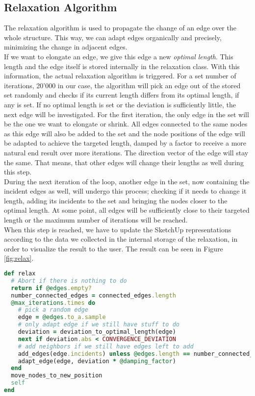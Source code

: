 \subsection{Relaxation Algorithm}\label{sec:relaxation}
The relaxation algorithm is used to propagate the change of an edge over the whole structure. This way, we can adapt edges organically and precisely, minimizing the change in adjacent edges.\\
If we want to elongate an edge, we give this edge a new \textit{optimal length}. This length and the edge itself is stored internally in the relaxation class. With this information, the actual relaxation algorithm is triggered. For a set number of iterations, 20'000 in our case, the algorithm will pick an edge out of the stored set randomly and checks if its current length differs from its optimal length, if any is set. If no optimal length is set or the deviation is sufficiently little, the next edge will be investigated. For the first iteration, the only edge in the set will be the one we want to elongate or shrink. All edges connected to the same nodes as this edge will also be added to the set and the node positions of the edge will be adapted to achieve the targeted length, damped by a factor to receive a more natural end result over more iterations. The direction vector of the edge will stay the same. That means, that other edges will change their lengths as well during this step.\\
During the next iteration of the loop, another edge in the set, now containing the incident edges as well, will undergo this process; checking if it needs to change it length, adding its incidents to the set and bringing the nodes closer to the optimal length. At some point, all edges will be sufficiently close to their targeted length or the maximum number of iterations will be reached.\\
When this step is reached, we have to update the SketchUp representations according to the data we collected in the internal storage of the relaxation, in order to visualize the result to the user. The result can be seen in Figure \ref{fig:relax}.

\begin{lstlisting}[language=Ruby, label={lst:relaxation}, caption=The relaxation algorithm]
def relax
  # Abort if there is nothing to do
  return if @edges.empty?
  number_connected_edges = connected_edges.length
  @max_iterations.times do
    # pick a random edge
    edge = @edges.to_a.sample
    # only adapt edge if we still have stuff to do
    deviation = deviation_to_optimal_length(edge)
    next if deviation.abs < CONVERGENCE_DEVIATION
    # add neighbors if we still have edges left to add
    add_edges(edge.incidents) unless @edges.length == number_connected_edges
    adapt_edge(edge, deviation * @damping_factor)
  end
  move_nodes_to_new_position
  self
end
\end{lstlisting}


